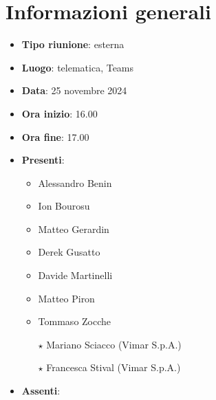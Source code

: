 \section{Informazioni generali}
\begin{itemize}
  \item \textbf{Tipo riunione}: esterna
  \item \textbf{Luogo}: telematica, Teams
  \item \textbf{Data}: 25 novembre 2024
  \item \textbf{Ora inizio}: 16.00
  \item \textbf{Ora fine}: 17.00
  
  \item \textbf{Presenti}:
  \begin{itemize}
    \item Alessandro Benin
    \item Ion Bourosu
    \item Matteo Gerardin
    \item Derek Gusatto
    \item Davide Martinelli
    \item Matteo Piron
    \item Tommaso Zocche
    \item[$\star$] Mariano Sciacco (Vimar S.p.A.)
    \item[$\star$] Francesca Stival (Vimar S.p.A.)
  \end{itemize}

  \item \textbf{Assenti}:
 
\end{itemize}